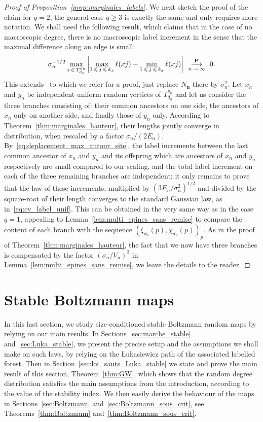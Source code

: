 \documentclass[AHL,Unicode,longabstracts,published]{cedram}
\newcommand{\ensembles}[1]{\mathbf{#1}}
\renewcommand{\P}{\ensembles{P}}
\newcommand{\1}{\ensembles{1}}
\newcommand{\bfnn}{\mathbf{n}}
\renewcommand{\le}{\leqslant}
\renewcommand{\ge}{\geqslant}
\newcommand{\fn}{T_{d_n}^{\varrho_n}}
\newcommand{\edges}{E}
\newcommand{\vertices}{V}
\newcommand{\cvproba}[1][n]{\enskip\mathop{\longrightarrow}^{\P}_{#1\,\to\, \infty}\enskip}
\begin{document}
\begin{proof}[Proof of Proposition~\ref{prop:marginales_labels}]
We next sketch the proof of the claim for $q=2$, the general case $q \ge 3$ is exactly the same and only requires more notation. We shall need the following result, which claims that in the case of no macroscopic degree, there is no macroscopic label increment in the sense that the maximal difference along an edge is small:
\begin{equation}\label{eq:deplacement_max_autour_site}
\sigma_n^{-1/2} \max_{x\,\in\,\fn} \left|\max_{1\,\le\,j \,\le\,k_x} \ell(xj) - \min_{1\,\le\,j\,\le\,k_x} \ell(xj)\right| \cvproba 0.
\end{equation}
This extends~\cite[Proposition~2]{Mar18b} to which we refer for a proof, just replace $N_\bfnn$ there by $\sigma_n^2$. Let $x_n$ and $y_n$ be independent uniform random vertices of $\fn$ and let us consider the three branches consisting of: their common ancestors on one side, the ancestors of $x_n$ only on another side, and finally those of $y_n$ only. According to Theorem~\ref{thm:marginales_hauteur}, their lengths jointly converge in distribution, when rescaled by a factor $\sigma_n/(2 \edges_n)$. By~\eqref{eq:deplacement_max_autour_site}, the label increments between the last common ancestor of $x_n$ and $y_n$ and its offspring which are ancestors of $x_n$ and $y_n$ respectively are small compared to our scaling, and the total label increment on each of the three remaining branches are independent; it only remains to prove that the law of these increments, multiplied by $(3 \edges_n/\sigma_n^2)^{1/2}$ and divided by the square-root of their length converges to the standard Gaussian law, as in~\eqref{eq:cv_label_unif}. This can be obtained in the very same way as in the case $q=1$, appealing to Lemma~\ref{lem:multi_epines_sans_remise} to compare the content of each branch with the sequence $(\xi_{d_n}(p), \chi_{d_n}(p))_p$. As in the proof of Theorem~\ref{thm:marginales_hauteur}, the fact that we now have three branches is compensated by the factor $(\sigma_n / \vertices_n)^3$ in Lemma~\ref{lem:multi_epines_sans_remise}, we leave the details to the reader.
\end{proof}


\section{Stable Boltzmann maps}\label{sec:BGW_Boltzmann}

In this last section, we study size-conditioned stable Boltzmann random maps by relying on our main results. In Sections~\ref{sec:marche_stable} and~\ref{sec:Luka_stable}, we present the precise setup and the assumptions we shall make on such laws, by relying on the {\L}ukasiewicz path of the associated labelled forest. Then in Section~\ref{sec:loi_sauts_Luka_stable} we state and prove the main result of this section, Theorem~\ref{thm:GW}, which shows that the random degree distribution satisfies the main assumptions from the introduction, according to the value of the stability index. We then easily derive the behaviour of the maps in Sections~\ref{sec:Boltzmann} and~\ref{sec:Boltzmann_sous_crit}, see Theorems~\ref{thm:Boltzmann} and~\ref{thm:Boltzmann_sous_crit}.
\end{document}
